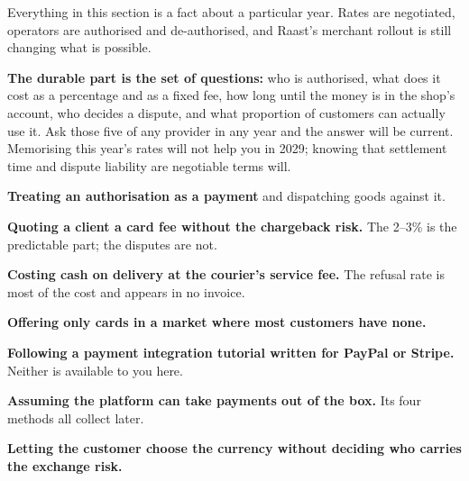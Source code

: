 \begin{alertbox}
Everything in this section is a fact about a particular year. Rates are
negotiated, operators are authorised and de-authorised, and Raast's merchant
rollout is still changing what is possible.

\smallskip
\textbf{The durable part is the set of questions:} who is authorised, what does
it cost as a percentage and as a fixed fee, how long until the money is in the
shop's account, who decides a dispute, and what proportion of customers can
actually use it. Ask those five of any provider in any year and the answer will
be current. Memorising this year's rates will not help you in 2029; knowing
that settlement time and dispute liability are negotiable terms will.
\end{alertbox}

\begin{pitfall}
\begin{tight}
  \item \textbf{Treating an authorisation as a payment} and dispatching goods
        against it.
  \item \textbf{Quoting a client a card fee without the chargeback risk.} The
        2--3\% is the predictable part; the disputes are not.
  \item \textbf{Costing cash on delivery at the courier's service fee.} The
        refusal rate is most of the cost and appears in no invoice.
  \item \textbf{Offering only cards in a market where most customers have
        none.}
  \item \textbf{Following a payment integration tutorial written for PayPal or
        Stripe.} Neither is available to you here.
  \item \textbf{Assuming the platform can take payments out of the box.} Its
        four methods all collect later.
  \item \textbf{Letting the customer choose the currency without deciding who
        carries the exchange risk.}
\end{tight}
\end{pitfall}

